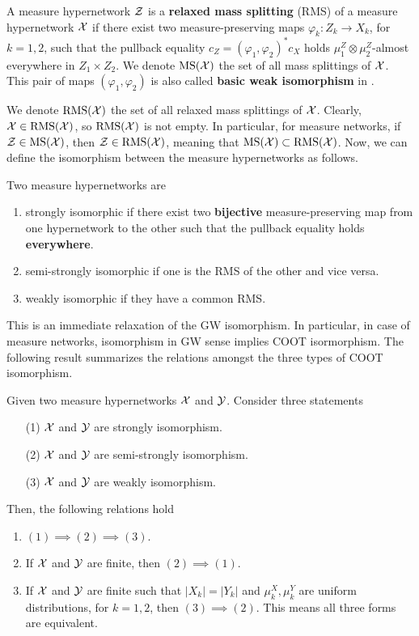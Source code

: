 \begin{definition}
  A measure hypernetwork $\mathcal Z$ is a \textbf{relaxed mass splitting} (RMS) of a
  measure hypernetwork $\mathcal X$ if there exist two measure-preserving maps
  $\varphi_k: Z_k \to X_k$, for $k=1,2$, such that the pullback equality
  $c_Z = (\varphi_1, \varphi_2)^*c_X$ holds $\mu^Z_1 \otimes \mu_2^Z$-almost everywhere
  in $Z_1 \times Z_2$. We denote $\text{MS}(\mathcal X)$ the set of all mass splittings
  of $\mathcal X$. This pair of maps $(\varphi_1, \varphi_2)$ is also called
  \textbf{basic weak isomorphism} in \citep{Chowdhury21b}.
\end{definition}
We denote $\text{RMS}(\mathcal X)$ the set of all relaxed mass splittings of $\mathcal X$. Clearly,
$\mathcal X \in \text{RMS}(\mathcal X)$, so $\text{RMS}(\mathcal X)$ is not empty.
In particular, for measure networks, if $\mathcal Z \in \text{MS}(\mathcal X)$, then $\mathcal Z \in \text{RMS}(\mathcal X)$,
meaning that $\text{MS}(\mathcal X) \subset \text{RMS}(\mathcal X)$. Now, we can define the isomorphism between
the measure hypernetworks as follows.
\begin{definition} \label{coot_isomorphic}
  Two measure hypernetworks are
  \begin{enumerate}
    \item strongly isomorphic if there exist two \textbf{bijective}
    measure-preserving map from one hypernetwork to the other such that the pullback equality holds
    \textbf{everywhere}.
    \item semi-strongly isomorphic if one is the RMS of the other and vice versa.
    \item weakly isomorphic if they have a common RMS.
  \end{enumerate}
\end{definition}
This is an immediate relaxation of the GW isomorphism. In particular,
in case of measure networks, isomorphism in GW sense implies COOT isormorphism.
The following result summarizes the relations amongst the three types of COOT isomorphism.
\begin{corollary} \label{prop:strong_weak_iso}
  Given two measure hypernetworks $\mathcal X$ and $\mathcal Y$. Consider three statements
  \begin{enumerate}
    \item[(1)] $\mathcal X$ and $\mathcal Y$ are strongly isomorphism.
    \item[(2)] $\mathcal X$ and $\mathcal Y$ are semi-strongly isomorphism.
    \item[(3)] $\mathcal X$ and $\mathcal Y$ are weakly isomorphism.
  \end{enumerate}
  Then, the following relations hold
  \begin{enumerate}
    \item $(1) \implies (2) \implies (3)$.
    \item If $\mathcal X$ and $\mathcal Y$ are finite, then $(2) \implies (1)$.
    \item If $\mathcal X$ and $\mathcal Y$ are finite such that $|X_k| = |Y_k|$
    and $\mu_k^X, \mu_k^Y$ are uniform distributions, for $k = 1,2$, then
    $(3) \implies (2)$. This means all three forms are equivalent.
  \end{enumerate}
\end{corollary}
